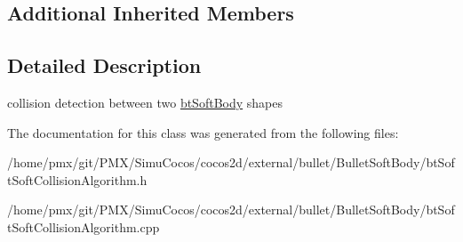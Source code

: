 \subsection*{Additional Inherited Members}


\subsection{Detailed Description}
collision detection between two \hyperlink{classbtSoftBody}{bt\+Soft\+Body} shapes 

The documentation for this class was generated from the following files\+:\begin{DoxyCompactItemize}
\item 
/home/pmx/git/\+P\+M\+X/\+Simu\+Cocos/cocos2d/external/bullet/\+Bullet\+Soft\+Body/bt\+Soft\+Soft\+Collision\+Algorithm.\+h\item 
/home/pmx/git/\+P\+M\+X/\+Simu\+Cocos/cocos2d/external/bullet/\+Bullet\+Soft\+Body/bt\+Soft\+Soft\+Collision\+Algorithm.\+cpp\end{DoxyCompactItemize}
